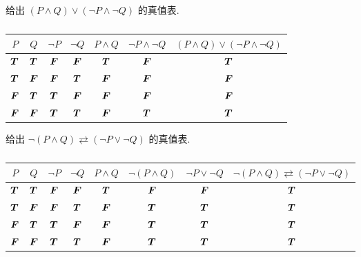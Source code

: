 \begin{example}
    给出 $(P\wedge Q)\vee (\neg P\wedge \neg Q)$ 的真值表.
\end{example}
\begin{table}[H]
    \centering
    \caption{}
    \begin{tabular}{c | c | c | c | c | c | c}
        $P$       & $Q$       & $\neg P$  & $\neg Q$  & $P\wedge Q$ & $\neg P\wedge \neg Q$ & $(P\wedge Q)\vee (\neg P\wedge \neg Q)$ \\
        \midrule
        $\vb*{T}$ & $\vb*{T}$ & $\vb*{F}$ & $\vb*{F}$ & $\vb*{T}$   & $\vb*{F}$             & $\vb*{T}$                               \\
        \midrule
        $\vb*{T}$ & $\vb*{F}$ & $\vb*{F}$ & $\vb*{T}$ & $\vb*{F}$   & $\vb*{F}$             & $\vb*{F}$                               \\
        \midrule
        $\vb*{F}$ & $\vb*{T}$ & $\vb*{T}$ & $\vb*{F}$ & $\vb*{F}$   & $\vb*{F}$             & $\vb*{F}$                               \\
        \midrule
        $\vb*{F}$ & $\vb*{F}$ & $\vb*{T}$ & $\vb*{T}$ & $\vb*{F}$   & $\vb*{T}$             & $\vb*{T}$                               \\
    \end{tabular}
\end{table}

\begin{example}
    给出 $\neg (P\wedge Q)\rightleftarrows (\neg P \vee \neg Q)$ 的真值表.
\end{example}
\begin{table}[H]
    \centering
    \caption{}
    \label{eishinCeremony}
    \begin{tabular}{c | c | c | c | c | c | c | c}
        $P$       & $Q$       & $\neg P$  & $\neg Q$  & $P\wedge Q$ & $\neg (P\wedge Q)$ & $\neg P\vee \neg Q$ & $\neg (P\wedge Q)\rightleftarrows (\neg P \vee \neg Q)$ \\
        \midrule
        $\vb*{T}$ & $\vb*{T}$ & $\vb*{F}$ & $\vb*{F}$ & $\vb*{T}$   & $\vb*{F}$          & $\vb*{F}$           & $\vb*{T}$                                               \\
        \midrule
        $\vb*{T}$ & $\vb*{F}$ & $\vb*{F}$ & $\vb*{T}$ & $\vb*{F}$   & $\vb*{T}$          & $\vb*{T}$           & $\vb*{T}$                                               \\
        \midrule
        $\vb*{F}$ & $\vb*{T}$ & $\vb*{T}$ & $\vb*{F}$ & $\vb*{F}$   & $\vb*{T}$          & $\vb*{T}$           & $\vb*{T}$                                               \\
        \midrule
        $\vb*{F}$ & $\vb*{F}$ & $\vb*{T}$ & $\vb*{T}$ & $\vb*{F}$   & $\vb*{T}$          & $\vb*{T}$           & $\vb*{T}$                                               \\
    \end{tabular}
\end{table}

